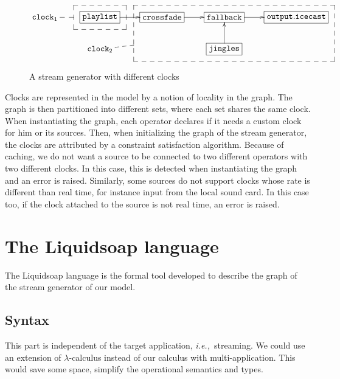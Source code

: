 \documentclass{llncs}
\newcommand{\liquidsoap}{Liquidsoap}
\newcommand{\ie}{{\em i.e.,}}
\begin{document}
\begin{figure}[htn]
 \begin{center}
\[
\def\f{\save
*+<15pt>[F--]\frm{}\ar @{--} "1,1"\restore}%
\def\g{\save
"2,4"."1,3"."1,5"!C*+<15pt>[F--]\frm{}\ar @{--} "2,2"\restore}%
\xymatrix{
   \mathtt{clock_1} & *+[F]{\mathtt{playlist}}\ar[r]\f&*+[F]{\mathtt{crossfade}}\ar[r]&  *+[F]{\mathtt{fallback}}\ar[r]&
  *+[F]{\mathtt{output.icecast}}\\
   &\mathtt{clock_2} &  & *+[F]{\mathtt{jingles}}\ar[u]\g& 
}
\]
\end{center}
 \caption{A stream generator with different clocks}
\end{figure}

Clocks are represented in the model by a notion of locality in the graph. The graph is then partitioned into 
different sets, where each set shares the same clock.
When instantiating the graph, each operator declares if it needs a custom clock for him or its sources. 
Then, when initializing the graph of the stream generator, the clocks are attributed by a constraint 
satisfaction algorithm. Because of caching, we do not want a source to be connected to two different operators with 
two different clocks. In this case, this is detected when instantiating the graph and an error is raised.
Similarly, some sources do not support clocks whose rate is different than real time, for instance input 
from the local sound card. In this case too, if the clock attached to the source is not real time, an error
is raised.



\section{The \liquidsoap{} language}
\label{sec:lang}

The \liquidsoap{} language is the formal tool developed to describe the graph of the
stream generator of our model.

\subsection{Syntax}

This part is independent of the target application, \ie\ streaming.
We could use an extension of $\lambda$-calculus instead of our calculus with
multi-application. This would save some space, simplify the operational 
semantics and types.
\end{document}
